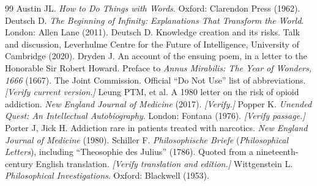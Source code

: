 \documentclass[11pt,a4paper]{article}
\theoremstyle{plain}
\theoremstyle{definition}
\theoremstyle{remark}
\begin{document}
\begin{thebibliography}{99}
\small
{} Austin JL. \emph{How to Do Things with Words}. Oxford: Clarendon Press (1962).
 Deutsch D. \emph{The Beginning of Infinity: Explanations That Transform the World}. London: Allen Lane (2011).
 Deutsch D. Knowledge creation and its risks. Talk and discussion, Leverhulme Centre for the Future of Intelligence, University of Cambridge (2020).
 Dryden J. An account of the ensuing poem, in a letter to the Honorable Sir Robert Howard. Preface to \emph{Annus Mirabilis: The Year of Wonders, 1666} (1667).
 The Joint Commission. Official ``Do Not Use'' list of abbreviations. \emph{[Verify current version.]}
 Leung PTM, et al. A 1980 letter on the risk of opioid addiction. \emph{New England Journal of Medicine} (2017). \emph{[Verify.]}
 Popper K. \emph{Unended Quest: An Intellectual Autobiography}. London: Fontana (1976). \emph{[Verify passage.]}
 Porter J, Jick H. Addiction rare in patients treated with narcotics. \emph{New England Journal of Medicine} (1980).
 Schiller F. \emph{Philosophische Briefe} (\emph{Philosophical Letters}), including ``Theosophie des Julius'' (1786). Quoted from a nineteenth-century English translation. \emph{[Verify translation and edition.]}
 Wittgenstein L. \emph{Philosophical Investigations}. Oxford: Blackwell (1953).
\end{thebibliography}
\end{document}
